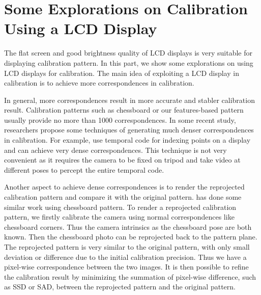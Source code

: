 \documentclass{report}
\begin{document}
\chapter{Some Explorations on Calibration Using a LCD Display}
The flat screen and good brightness quality of LCD displays is very suitable for displaying calibration pattern. In this part, we show some explorations on using LCD displays for calibration. The main idea of exploiting a LCD display in calibration is to achieve more correspondences in calibration. 

In general, more correspondences result in more accurate and stabler calibration result. Calibration patterns such as chessboard or our features-based pattern usually provide no more than 1000 correspondences. In some recent study, researchers propose some techniques of generating much denser correspondences in calibration.  For example, \cite{grosse2012camera, schmalz2011camera} use temporal code for indexing points on a display and can achieve very dense correspondences. This technique is not very convenient as it requires the camera to be fixed on tripod and take video at different poses to percept the entire temporal code. 

Another aspect to achieve dense correspondences is to render the reprojected calibration pattern and compare it with the original pattern. \cite{schiller2008calibration} has done some similar work using chessboard pattern. To render a reprojected calibration pattern, we firstly calibrate the camera using normal correspondences like chessboard corners. Thus the camera intrinsics as the chessboard pose are both known. Then the chessboard photo can be reprojected back to the pattern plane. The reprojected pattern is very similar to the original pattern, with only small deviation or difference due to the initial calibration precision. Thus we have a pixel-wise correspondence between the two images. It is then possible to refine the calibration result by minimizing the summation of pixel-wise difference, such as SSD or SAD, between the reprojected pattern and the original pattern. 
\end{document}
